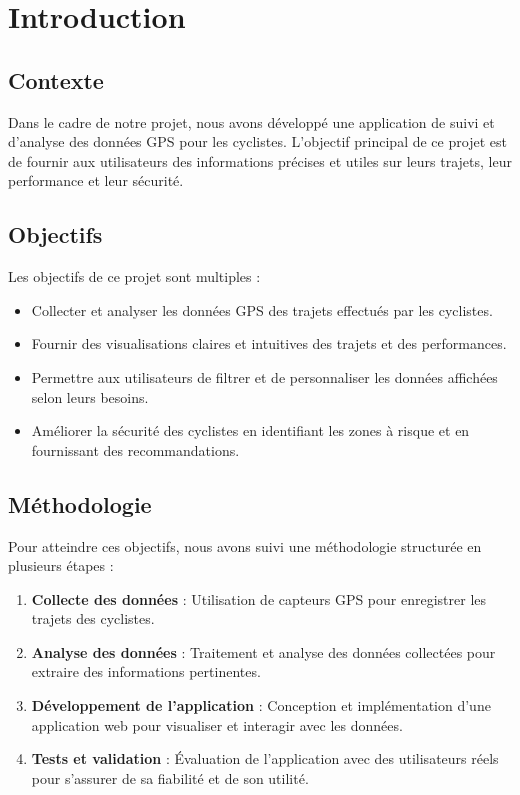 \section{Introduction}

\subsection{Contexte}

Dans le cadre de notre projet, nous avons développé une application de suivi et d'analyse des données GPS pour les cyclistes. L'objectif principal de ce projet est de fournir aux utilisateurs des informations précises et utiles sur leurs trajets, leur performance et leur sécurité.

\subsection{Objectifs}

Les objectifs de ce projet sont multiples :
\begin{itemize}
    \item Collecter et analyser les données GPS des trajets effectués par les cyclistes.
    \item Fournir des visualisations claires et intuitives des trajets et des performances.
    \item Permettre aux utilisateurs de filtrer et de personnaliser les données affichées selon leurs besoins.
    \item Améliorer la sécurité des cyclistes en identifiant les zones à risque et en fournissant des recommandations.
\end{itemize}

\subsection{Méthodologie}

Pour atteindre ces objectifs, nous avons suivi une méthodologie structurée en plusieurs étapes :
\begin{enumerate}
    \item \textbf{Collecte des données} : Utilisation de capteurs GPS pour enregistrer les trajets des cyclistes.
    \item \textbf{Analyse des données} : Traitement et analyse des données collectées pour extraire des informations pertinentes.
    \item \textbf{Développement de l'application} : Conception et implémentation d'une application web pour visualiser et interagir avec les données.
    \item \textbf{Tests et validation} : Évaluation de l'application avec des utilisateurs réels pour s'assurer de sa fiabilité et de son utilité.
\end{enumerate}

